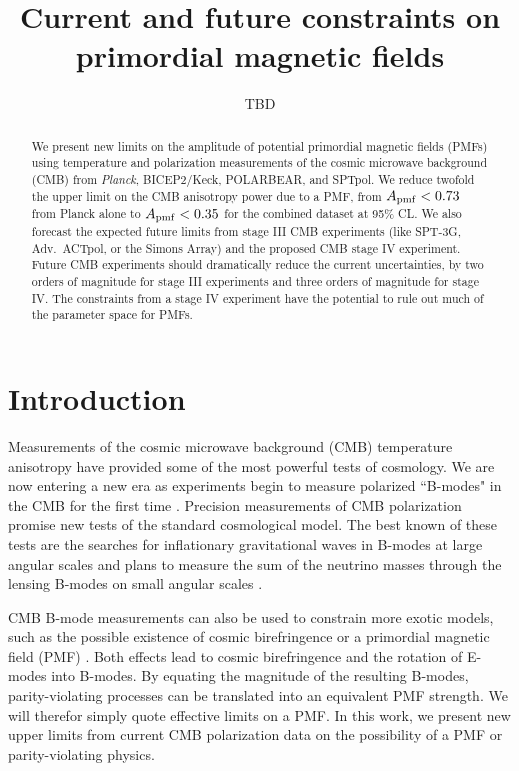 \documentclass[preprint]{emulateapj}
\newcommand{\apmf}{\ensuremath{A_{\rm pmf}}}
\newcommand{\planck}{{\sl Planck}}
\newcommand{\bicepkeck}{BICEP2/Keck}
\newcommand{\sptnew}{SPT-3G}
\newcommand{\pb}{POLARBEAR}
\newcommand{\simons}{Simons Array}
\newcommand{\sptpol}{SPTpol}
\newcommand{\advactpol}{Adv.~ACTpol}
\newcommand{\tbd}[1]{\textcolor{Red}{{\bf TBD}: #1}}
\begin{document}
\title{Current and future constraints on primordial magnetic fields}
\author{TBD}


\begin{abstract}

We present new limits on the amplitude of potential primordial magnetic fields (PMFs) using temperature and polarization measurements of the cosmic microwave background (CMB)  from \planck{}, \bicepkeck{}, \pb, and \sptpol. 
We reduce twofold the upper limit on the CMB anisotropy power due to a PMF, from $\apmf < 0.73$ from Planck alone to $\apmf < 0.35$ for the combined dataset at 95\% CL. 
We also forecast the expected future limits from stage III CMB experiments (like \sptnew{},  \advactpol, or the \simons) and the proposed CMB stage IV experiment. 
Future CMB experiments should dramatically reduce the current uncertainties, by two orders of magnitude for stage III experiments and three orders of magnitude for stage IV. 
The constraints from a stage IV experiment have the potential to rule out much of the parameter space for PMFs.

\end{abstract}

\section{Introduction}
\label{sec:intro}

Measurements of the cosmic microwave background (CMB) temperature anisotropy have provided some of the most powerful tests of cosmology. 
We are now entering a new era as experiments begin to measure  polarized ``B-modes" in the CMB for the first time \citep{hanson13,polarbear14b,bicep2014a,naess14,keisler15,bicepkeck15,louis16}. 
Precision measurements of CMB polarization promise new tests of the standard cosmological model. 
The best known of these tests are the searches for inflationary gravitational waves in B-modes at large angular scales and plans to measure the sum of the neutrino masses through the lensing B-modes on small angular scales \citep[for a recent review see,][]{abazajian16}. 

CMB B-mode measurements can also be used to constrain more exotic models, such as the possible existence of cosmic birefringence \citep{carroll98,lue99} or a primordial magnetic field (PMF) \citep{kosowsky96, seshadri01}.  
Both effects lead to cosmic birefringence and the rotation of E-modes into B-modes. 
By equating the magnitude of the resulting B-modes, parity-violating processes can be translated into an equivalent PMF strength. 
We will therefor simply quote effective limits on a PMF. 
In this work, we present new upper limits from current CMB polarization data on the possibility of a PMF or parity-violating physics. 
\end{document}
